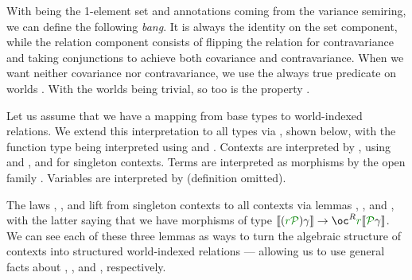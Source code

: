 \begin{example}
  With  being the 1-element set and annotations coming from the
  variance semiring, we can define the following \emph{bang}.
  It is always the identity on the set component, while the relation component
  consists of flipping the relation for contravariance and taking conjunctions
  to achieve both covariance and contravariance.
  When we want neither covariance nor contravariance, we use the always true
  predicate on worlds .
  With the worlds being trivial, so too is the property .

\end{example}

%
%
%

Let us assume that we have a mapping
\AgdaBound{$\upiota\llbracket$\_$\rrbracket$} from base types to world-indexed
relations.
We extend this interpretation to all types via
\AgdaFunction{$\llbracket$\_$\rrbracket$}, shown below, with
the function type being interpreted using  and
.
Contexts are interpreted by , using
 and , and 
for singleton contexts.
Terms are interpreted as morphisms by the open family
\AgdaFunction{$\llbracket$\_$\vdash$\_$\rrbracket$}.
Variables are interpreted by  (definition omitted).


The laws , , and  lift
from singleton contexts to all contexts via lemmas ,
, and , with the latter saying that we
have morphisms of type
\mbox{$\sem{\plr{\gr r\grP}\gamma} \to \oc^R\gr r\sem{\grP\gamma}$}.
We can see each of these three lemmas as ways to turn the algebraic structure of
contexts into structured world-indexed relations --- allowing us to use general
facts about , , and
, respectively.

